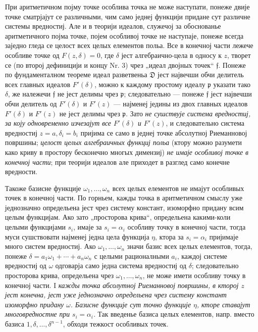 ﻿\documentclass[11pt]{article}
\providecommand{\frD}{\mathfrak D}
\providecommand{\frf}{\mathfrak f}
\providecommand{\frp}{\mathfrak p}
\begin{document}
При аритметичном појму точке особлива точка не може наступати, понеже двије точке сматрјајут се различными, чим само једнеј функцији придане сут различне системы вредностиј. Але и в теорији идеалов, служечој за обоснованье аритметичного појма точке, појем особливој точке не наступаје, понеже всегда заједно гледа се целост всех целых елементов польа. Все в конечној части лежече особливе точке од \(F(z,\delta)=0\), где \(\delta\) јест алгебраично-цела в односу к \(z\), творет се (по второј дефиницији и концу Nr. 3) чрез „идеал двојных точек“ \(\frf\). Понеже по фундаменталном теореме идеал разветвеньа \(\frD\) јест највечши обчи делитель всех главных идеалов \(F'(\delta)\), можно к каждому простому идеалу \(\frp\) указати тако \(\delta\), же належечи \(\frf\) не јест делимы чрез \(\frp\); следовательно --- понеже \(\frf\) јест највечши обчи делитель од \(F'(\delta)\) и \(F'(z)\) --- најменеј једины из двох главных идеалов \(F'(\delta)\) и \(F'(z)\) не јест делимы чрез \(\frp\). Зато {\itshape не сушствује система вредностиј, за коју одновременно изчезајут все \(F'(\delta)\) и \(F'(z)\)}, и следовательно система вредностиј \(z=a,\delta_i=b_i\) пријима се само в једнеј точке абсолутној Риеманновој површины; {\itshape целост целых алгебраичных функциј польа} (ктору можно разумети како криву в простору бесконечно многых димензиј) {\itshape не имаје особливој точке в конечној части}; при теорији идеалов але приходет в разглед само конечне вредности.

Такоже базисне функције \(\omega_1,\ldots,\omega_n\) всех целых елементов не имајут особливых точек в конечној части. По горньем, кажды точка в аритметичном смыслу уже једнозначно определьена јест чрез систему констант, изоморфно придану всим целым функцијам. Ако зато „просторова крива“, определьена какими-коли целыми функцијами \(s_i\), имаје за \(s_i=\alpha_i\) особливу точку в конечној части, тогда муси сушствовати најменеј једна цела функција \(\eta\), ктора за \(s_i=\alpha_i\) пријимаје много систем вредностиј. Ако \(\omega_1,\ldots,\omega_n\) значи базис всех целых елементов, тогда, понеже \(\delta=a_1\omega_1+\cdots+a_n\omega_n\) с целыми рационалными \(a_i\), каждој системе вредностиј од \(\omega\) одговарја само једна система вредностиј од \(\delta\); следовательно просторова крива, определьена чрез \(\omega_1,\ldots,\omega_n\), не може имети особливу точку в конечној части. I {\itshape кажды точка абсолутној Риеманновој површины, в кторој \(z\) јест конечна, јест уже једнозначно определьена чрез систему констант изоморфно придану \(\omega\). Базисне функције сут точно функције \(\eta\), кторе ставајут многовредностне при \(s_i=\alpha_i\).} Так введенье базиса целых елементов, напр. вместо базиса \(1,\delta,\ldots,\delta^{n-1}\), обходи тежкост особливых точек.
\end{document}
